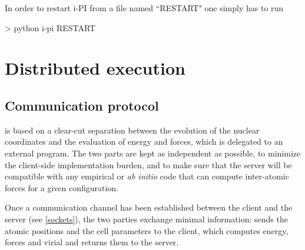 \documentclass[11pt,english,fleqn]{report}
\newenvironment{code}{%
\footnotesize 
\verbatim
}{
\endverbatim
\normalsize
}
\begin{document}
In order to restart i-PI from a file named ``RESTART" one simply has to run

\begin{code}
> python i-pi RESTART 
\end{code}


\section{Distributed execution}

\label{distrib}

\subsection{Communication protocol}

\ipi is based on a clear-cut separation between the 
evolution of the nuclear coordinates and the evaluation of energy
and forces, which is delegated to an external program.
The two parts are kept as independent as possible, to minimize
the client-side implementation burden, and to make sure that the 
server will be compatible with any empirical or \emph{ab initio} code that 
can compute inter-atomic forces for a given configuration.

Once a communication channel has been established between the 
client and the server (see \ref{sockets}), the two parties
exchange minimal information: \ipi{} sends the atomic positions
and the cell parameters to the client, which computes energy, forces
and virial and returns them to the server. 
\end{document}
